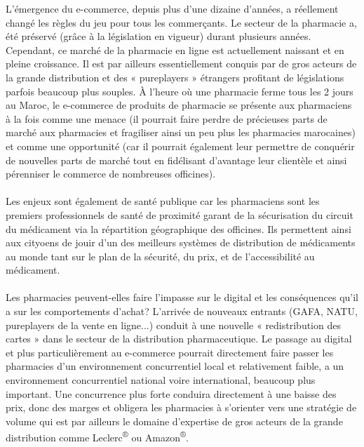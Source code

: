 L’émergence du e-commerce, depuis plus d’une dizaine d’années, a réellement changé les règles du jeu pour tous les commerçants. Le secteur de la pharmacie a, été préservé (grâce à la législation en vigueur) durant plusieurs années. Cependant, ce marché de la pharmacie en ligne est actuellement naissant et en pleine croissance. Il est par ailleurs essentiellement conquis par de gros acteurs de la grande distribution et des « pureplayers » étrangers profitant de législations parfois beaucoup plus souples. À l’heure où une pharmacie ferme tous les 2 jours au Maroc, le e-commerce de produits de pharmacie se présente aux pharmaciens à la fois comme une menace (il pourrait faire perdre de précieuses parts de marché aux pharmacies et fragiliser ainsi un peu plus les pharmacies marocaines) et comme une opportunité (car il pourrait également leur permettre de conquérir de nouvelles parts de marché tout en fidélisant d’avantage leur clientèle et ainsi pérenniser le commerce de nombreuses officines).
\\ \\
Les enjeux sont également de santé publique car les pharmaciens sont les premiers professionnels de santé de proximité garant de la sécurisation du circuit du médicament via la répartition géographique des officines. Ils permettent ainsi aux cityoens de jouir d’un des meilleurs systèmes de distribution de médicaments au monde tant sur le plan de la sécurité, du prix, et de l’accessibilité au médicament.
\\ \\
Les pharmacies peuvent-elles faire l’impasse sur le digital et les conséquences qu’il a sur les comportements d’achat? L’arrivée de nouveaux entrants (GAFA, NATU, pureplayers de la vente en ligne...) conduit à une nouvelle « redistribution des cartes » dans le secteur de la distribution pharmaceutique. Le passage au digital et plus particulièrement au e-commerce pourrait directement faire passer les pharmacies d’un environnement concurrentiel local et relativement faible, a un environnement concurrentiel national voire international, beaucoup plus important. Une concurrence plus forte conduira directement à une baisse des prix, donc des marges et obligera les pharmacies à s’orienter vers une stratégie de volume qui est par ailleurs le domaine d’expertise de gros acteurs de la grande distribution comme Leclerc\textsuperscript{®} ou Amazon\textsuperscript{®}.
\\ \\
